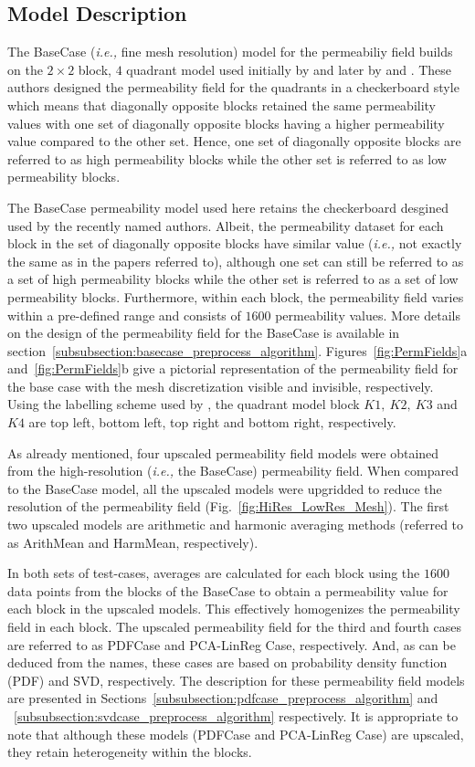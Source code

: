 \documentclass[preprint,12pt]{elsarticle}
\newcommand{\ie}{{\it i.e., }}
\begin{document}
\subsection{Model Description}\label{subsection:model}
The BaseCase  (\ie fine mesh resolution) model for the permeabiliy field builds on the $2 \times 2$ block, $4$ quadrant model used initially by \citet{Cardwell_1945} and later by \citet{Yeo2001} and \citet{dawe_2008}. These authors designed the permeability field for the quadrants in a checkerboard style which means that diagonally opposite blocks retained the same permeability values with one set of diagonally opposite blocks having a higher permeability value compared to the other set. Hence, one set of diagonally opposite blocks are referred to as high permeability blocks while the other set is referred to as low permeability blocks.

The BaseCase permeability model used here retains the checkerboard desgined used by the recently named authors. Albeit, the permeability dataset for each block in the set of diagonally opposite blocks have similar value (\ie not exactly the same as in the papers referred to), although one set can still be referred to as a set of high permeability blocks while the other set is referred to as a set of low permeability blocks. Furthermore, within each block, the permeability field varies within a pre-defined range and consists of $1600$ permeability values. More details on the design of the permeability field for the BaseCase is available in section~\ref{subsubsection:basecase_preprocess_algorithm}. Figures~\ref{fig:PermFields}a and~\ref{fig:PermFields}b give a pictorial representation of the permeability field for the base case with the mesh discretization visible and invisible, respectively.  Using the labelling scheme used by \citet{dawe_2008}, the quadrant model block $K1,~K2,~K3$ and $K4$ are top left, bottom left, top right and bottom right, respectively.

As already mentioned, four upscaled permeability field models were obtained from the high-resolution (\ie the BaseCase) permeability field. When compared to the BaseCase model, all the upscaled models were upgridded to reduce the resolution of the permeability field (Fig.~\ref{fig:HiRes_LowRes_Mesh}). The first two upscaled models are arithmetic and harmonic averaging methods  (referred to as ArithMean and HarmMean, respectively).

In both sets of test-cases, averages are calculated for each block using the $1600$ data points from the blocks of the BaseCase to obtain a permeability value for each block in the upscaled models. This effectively homogenizes the permeability field in each block. The upscaled permeability field for the third and fourth cases are referred to as PDFCase and PCA-LinReg Case, respectively. And, as can be deduced from the names, these cases are based on probability density function (PDF) and SVD, respectively. The description for these permeability field models are presented in Sections~\ref{subsubsection:pdfcase_preprocess_algorithm} and ~\ref{subsubsection:svdcase_preprocess_algorithm} respectively. It is appropriate to note that although these models (PDFCase and PCA-LinReg Case) are upscaled, they retain heterogeneity within the blocks.
\end{document}

